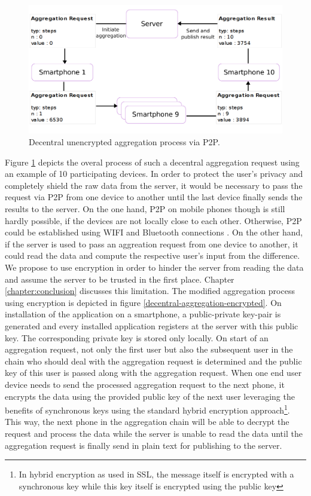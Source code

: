 \begin{figure}[h!]
	\includegraphics[width=\textwidth]{data/diagrams/decentral-aggregation-6.png}
	\caption{Decentral unencrypted aggregation process via P2P.}
	\label{decentral-aggregation-unencrypted}
\end{figure}

Figure \ref{decentral-aggregation-unencrypted} depicts the overal process of such a decentral aggregation request using an example of 10 participating devices.
In order to protect the user's privacy and completely shield the raw data from the server, it would be necessary to pass the request via P2P from one device to another until the last device finally sends the results to the server. On the one hand, P2P on mobile phones though is still hardly possible, if the devices are not locally close to each other. Otherwise, P2P could be established using WIFI and Bluetooth connections \parencite{p2p-android}. On the other hand, if the server is used to pass an aggreation request from one device to another, it could read the data and compute the respective user's input from the difference. We propose to use encryption in order to hinder the server from reading the data and assume the server to be trusted in the first place. Chapter \ref{chapter:conclusion} discusses this limitation. The modified aggregation process using encryption is depicted in figure \ref{decentral-aggregation-encrypted}. On installation of the application on a smartphone, a public-private key-pair is generated and every installed application registers at the server with this public key. The corresponding private key is stored only locally. On start of an aggregation request, not only the first user but also the subsequent user in the chain who should deal with the aggregation request is determined and the public key of this user is passed along with the aggregation request. When one end user device needs to send the processed aggregation request to the next phone, it encrypts the data using the provided public key of the next user leveraging the benefits of synchronous keys using the standard hybrid encryption approach\footnote{In hybrid encryption as used in SSL, the message itself is encrypted with a synchronous key while this key itself is encrypted using the public key}. This way, the next phone in the aggregation chain will be able to decrypt the request and process the data while the server is unable to read the data until the aggregation request is finally send in plain text for publishing to the server. 

